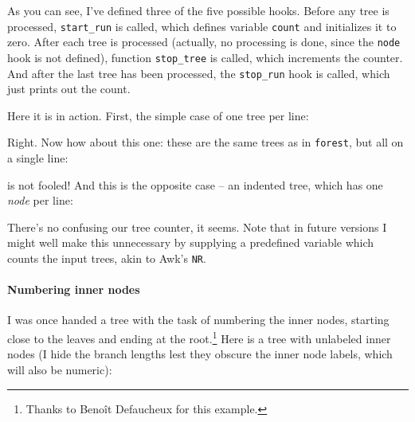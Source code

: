 \begin{samepage}


\end{samepage}

As you can see, I've defined three of the five possible hooks. Before any tree
is processed, \texttt{start\_run} is called, which defines variable
\texttt{count} and initializes it to zero. After each tree is processed
(actually, no processing is done, since the \texttt{node} hook is not defined),
function \texttt{stop\_tree} is called, which increments the counter. And after
the last tree has been processed, the \texttt{stop\_run} hook is called, which
just prints out the count.

Here it is in action. First, the simple case of one tree per line:







\noindent{}Right. Now how about this one: these are the same trees as in
\texttt{forest}, but all on a single line:







\noindent{}\luaed{} is not fooled! And this is the opposite case -- an indented tree, which has one \emph{node} per line:







There's no confusing our tree counter, it seems. Note that in future versions I
might well make this unnecessary by supplying a predefined variable which counts
the input trees, akin to Awk's \texttt{NR}.

\paragraph{Numbering inner nodes}

I was once handed a tree with the task of numbering the inner nodes, starting
close to the leaves and ending at the root.\footnote{Thanks to Beno\^{i}t
Defaucheux for this example.} Here is a tree with unlabeled inner nodes (I hide
the branch lengths lest they obscure the inner node labels, which will also be
numeric):


